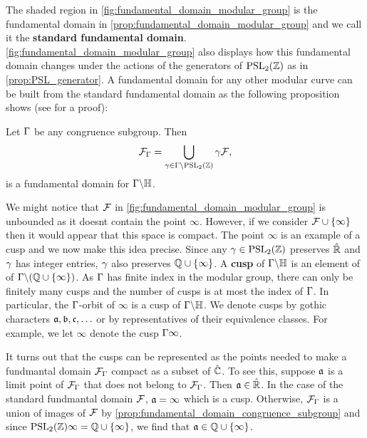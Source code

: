       The shaded region in \cref{fig:fundamental_domain_modular_group} is the fundamental domain in \cref{prop:fundamental_domain_modular_group} and we call it the \textbf{standard fundamental domain}. \cref{fig:fundamental_domain_modular_group} also displays how this fundamental domain changes under the actions of the generators of $\mathrm{PSL}_{2}(\mathbb{Z})$ as in \cref{prop:PSL_generator}. A fundamental domain for any other modular curve can be built from the standard fundamental domain as the following proposition shows (see \cite{kilford2015modular} for a proof):

      \begin{proposition}\label{prop:fundamental_domain_congruence_subgroup}
        Let $\Gamma$ be any congruence subgroup. Then
        \[
          \mathcal{F}_{\Gamma} = \bigcup_{\gamma \in \Gamma\backslash\mathrm{PSL}_{2}(\mathbb{Z})}\gamma\mathcal{F},
        \]
        is a fundamental domain for $\Gamma\backslash\mathbb{H}$.
      \end{proposition}

      We might notice that $\mathcal{F}$ in \cref{fig:fundamental_domain_modular_group} is unbounded as it doesnt contain the point $\infty$. However, if we consider $\mathcal{F} \cup \{\infty\}$ then it would appear that this space is compact. The point $\infty$ is an example of a cusp and we now make this idea precise. Since any $\gamma \in \mathrm{PSL}_{2}(\mathbb{Z})$ preserves $\hat{\mathbb{R}}$ and $\gamma$ has integer entries, $\gamma$ also preserves $\mathbb{Q} \cup \{\infty\}$. A \textbf{cusp} of $\Gamma\backslash\mathbb{H}$ is an element of of $\Gamma\backslash(\mathbb{Q} \cup \{\infty\})$. As $\Gamma$ has finite index in the modular group, there can only be finitely many cusps and the number of cusps is at most the index of $\Gamma$. In particular, the $\Gamma$-orbit of $\infty$ is a cusp of $\Gamma\backslash\mathbb{H}$. We denote cusps by gothic characters $\mathfrak{a},\mathfrak{b},\mathfrak{c},\ldots$ or by representatives of their equivalence classes. For example, we let $\infty$ denote the cusp $\Gamma\infty$.

      \begin{remark}
        It turns out that the cusps can be represented as the points needed to make a fundmantal domain $\mathcal{F}_{\Gamma}$ compact as a subset of $\hat{\mathbb{C}}$. To see this, suppose $\mathfrak{a}$ is a limit point of $\mathcal{F}_{\Gamma}$ that does not belong to $\mathcal{F}_{\Gamma}$. Then $\mathfrak{a} \in \hat{\mathbb{R}}$. In the case of the standard fundmantal domain $\mathcal{F}$, $\mathfrak{a} = \infty$ which is a cusp. Otherwise, $\mathcal{F}_{\Gamma}$ is a union of images of $\mathcal{F}$ by \cref{prop:fundamental_domain_congruence_subgroup} and since $\mathrm{PSL}_{2}(\mathbb{Z})\infty = \mathbb{Q} \cup \{\infty\}$, we find that $\mathfrak{a} \in \mathbb{Q} \cup \{\infty\}$.
      \end{remark}

